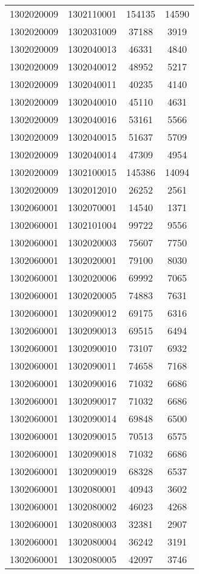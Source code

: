 \begin{longtable}[h]{llcc}
		1302020009 & 1302110001 & 154135 & 14590\\
		1302020009 & 1302031009 & 37188 & 3919\\
		1302020009 & 1302040013 & 46331 & 4840\\
		1302020009 & 1302040012 & 48952 & 5217\\
		1302020009 & 1302040011 & 40235 & 4140\\
		1302020009 & 1302040010 & 45110 & 4631\\
		1302020009 & 1302040016 & 53161 & 5566\\
		1302020009 & 1302040015 & 51637 & 5709\\
		1302020009 & 1302040014 & 47309 & 4954\\
		1302020009 & 1302100015 & 145386 & 14094\\
		1302020009 & 1302012010 & 26252 & 2561\\
		1302060001 & 1302070001 & 14540 & 1371\\
		1302060001 & 1302101004 & 99722 & 9556\\
		1302060001 & 1302020003 & 75607 & 7750\\
		1302060001 & 1302020001 & 79100 & 8030\\
		1302060001 & 1302020006 & 69992 & 7065\\
		1302060001 & 1302020005 & 74883 & 7631\\
		1302060001 & 1302090012 & 69175 & 6316\\
		1302060001 & 1302090013 & 69515 & 6494\\
		1302060001 & 1302090010 & 73107 & 6932\\
		1302060001 & 1302090011 & 74658 & 7168\\
		1302060001 & 1302090016 & 71032 & 6686\\
		1302060001 & 1302090017 & 71032 & 6686\\
		1302060001 & 1302090014 & 69848 & 6500\\
		1302060001 & 1302090015 & 70513 & 6575\\
		1302060001 & 1302090018 & 71032 & 6686\\
		1302060001 & 1302090019 & 68328 & 6537\\
		1302060001 & 1302080001 & 40943 & 3602\\
		1302060001 & 1302080002 & 46023 & 4268\\
		1302060001 & 1302080003 & 32381 & 2907\\
		1302060001 & 1302080004 & 36242 & 3191\\
		1302060001 & 1302080005 & 42097 & 3746\\

\end{longtable}
